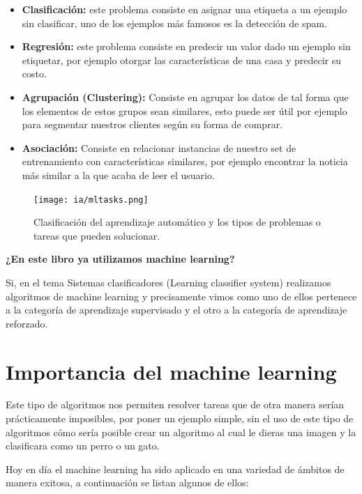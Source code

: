\documentclass[11pt,fleqn]{book} %
\begin{document}
\begin{itemize}
\item \textbf{Clasificación:} este problema consiste en asignar una etiqueta a un ejemplo sin clasificar, uno de los ejemplos más famosos es la detección de spam.
\item \textbf{Regresión:} este problema consiste en predecir un valor dado un ejemplo sin etiquetar, por ejemplo otorgar las características de una casa y predecir su costo.
\item \textbf{Agrupación (Clustering):} Consiste en agrupar los datos de tal forma que los elementos de estos grupos sean similares, esto puede ser útil por ejemplo para segmentar nuestros clientes según su forma de comprar.
\item \textbf{Asociación:} Consiste en relacionar instancias de nuestro set de entrenamiento con características similares, por ejemplo encontrar la noticia más similar a la que acaba de leer el usuario.
\end{itemize}

\begin{figure}[ht]
\centering\texttt{[image: ia/mltasks.png]}
\caption{Clasificación del aprendizaje automático y los tipos de problemas o tareas que pueden solucionar.}

\label{fig:mltasks} 
\end{figure}

\textbf{¿En este libro ya utilizamos machine learning?}

Si, en el tema Sistemas clasificadores (Learning classifier system) realizamos algoritmos de machine learning y precisamente vimos como uno de ellos pertenece a la categoría de aprendizaje supervisado y el otro a la categoría de aprendizaje reforzado.

\section{Importancia del machine learning} 

Este tipo de algoritmos nos permiten resolver tareas que de otra manera serían prácticamente imposibles, por poner un ejemplo simple, sin el uso de este tipo de algoritmos cómo sería posible crear un algoritmo al cual le dieras una imagen y la clasificara como un perro o un gato.

Hoy en día el machine learning ha sido aplicado en una variedad de ámbitos de manera exitosa, a continuación se listan algunos de ellos:
\end{document}
